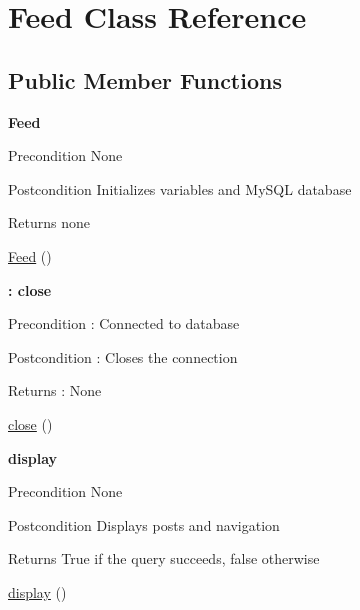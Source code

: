 \hypertarget{class_feed}{}\section{Feed Class Reference}
\label{class_feed}
\subsection*{Public Member Functions}
\begin{Indent}{\bf Feed}\par
{\em \begin{DoxyPrecond}{Precondition}
None 
\end{DoxyPrecond}
\begin{DoxyPostcond}{Postcondition}
Initializes variables and My\+S\+QL database 
\end{DoxyPostcond}
\begin{DoxyReturn}{Returns}
none 
\end{DoxyReturn}
}\begin{DoxyCompactItemize}
\item 
\hyperlink{class_feed_ad8f4a692bde08dca66fdf5f165b4f842}{Feed} ()
\end{DoxyCompactItemize}
\end{Indent}
\begin{Indent}{\bf \+: close}\par
{\em \begin{DoxyPrecond}{Precondition}
\+: Connected to database 
\end{DoxyPrecond}
\begin{DoxyPostcond}{Postcondition}
\+: Closes the connection 
\end{DoxyPostcond}
\begin{DoxyReturn}{Returns}
\+: None 
\end{DoxyReturn}
}\begin{DoxyCompactItemize}
\item 
\hyperlink{class_feed_aa69c8bf1f1dcf4e72552efff1fe3e87e}{close} ()
\end{DoxyCompactItemize}
\end{Indent}
\begin{Indent}{\bf display}\par
{\em \begin{DoxyPrecond}{Precondition}
None 
\end{DoxyPrecond}
\begin{DoxyPostcond}{Postcondition}
Displays posts and navigation 
\end{DoxyPostcond}
\begin{DoxyReturn}{Returns}
True if the query succeeds, false otherwise 
\end{DoxyReturn}
}\begin{DoxyCompactItemize}
\item 
\hyperlink{class_feed_a0b9b6e6acd4a839fc7c2f26f96b5cfa8}{display} ()
\end{DoxyCompactItemize}
\end{Indent}


